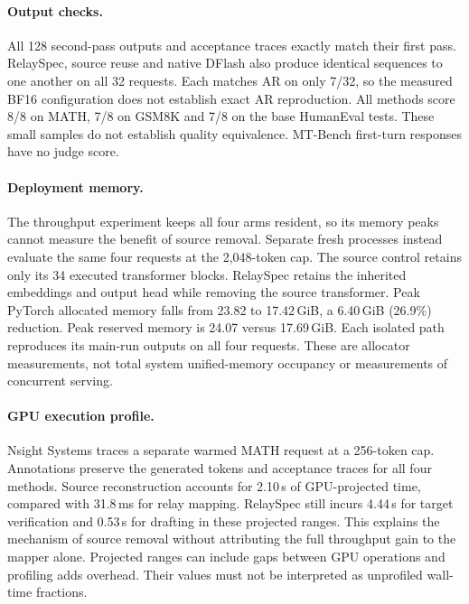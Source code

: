 \documentclass{article}
\begin{document}
\begin{table}[H]
\caption{GB10 replication, 32 requests and two timing passes. Correct
M/G/C counts score eight MATH, GSM8K and HumanEval outputs each.
Isolated memory uses four fixed requests in fresh processes.
Energy integrates one-second device-power samples, not wall-socket power.}
\label{tab:gb10}
\centering\small
\setlength{\tabcolsep}{3pt}

\end{table}

\paragraph{Output checks.}
All 128 second-pass outputs and acceptance traces exactly match their
first pass. RelaySpec, source reuse and native DFlash also produce identical
sequences to one another on all 32 requests. Each matches AR on only 7/32,
so the measured BF16 configuration does not establish exact AR reproduction.
All methods score 8/8 on MATH, 7/8 on GSM8K and 7/8 on the base HumanEval
tests. These small samples do not establish quality equivalence.
MT-Bench first-turn responses have no judge score.

\paragraph{Deployment memory.}
The throughput experiment keeps all four arms resident, so its memory
peaks cannot measure the benefit of source removal. Separate fresh
processes instead evaluate the same four requests at the 2,048-token cap.
The source control retains only its 34 executed transformer blocks.
RelaySpec retains the inherited embeddings and output head while removing
the source transformer. Peak PyTorch allocated memory falls from 23.82
to 17.42\,GiB, a 6.40\,GiB (26.9\%) reduction. Peak reserved memory is
24.07 versus 17.69\,GiB. Each isolated path reproduces its main-run
outputs on all four requests. These are allocator measurements, not total
system unified-memory occupancy or measurements of concurrent serving.

\paragraph{GPU execution profile.}
Nsight Systems traces a separate warmed MATH request at a 256-token cap.
Annotations preserve the generated tokens and acceptance traces for all
four methods. Source reconstruction accounts for 2.10\,s of GPU-projected
time, compared with 31.8\,ms for relay mapping. RelaySpec still incurs
4.44\,s for target verification and 0.53\,s for drafting in these projected
ranges. This explains the mechanism of source removal without attributing
the full throughput gain to the mapper alone. Projected ranges can include
gaps between GPU operations and profiling adds overhead. Their values
must not be interpreted as unprofiled wall-time fractions.
\end{document}
